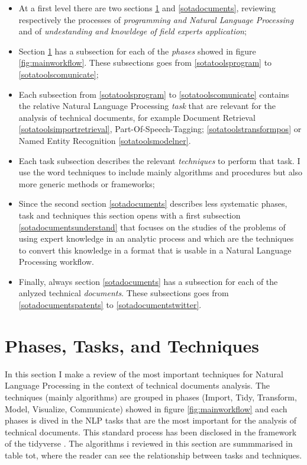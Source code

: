 \documentclass[]{book}
\providecommand{\tightlist}{%
  \setlength{\itemsep}{0pt}\setlength{\parskip}{0pt}}
\begin{document}
\begin{itemize}
\tightlist
\item
  At a first level there are two sections \ref{sotatools} and
  \ref{sotadocuments}, reviewing respectively the processes of
  \emph{programming and Natural Language Processing} and of
  \emph{undestanding and knowldege of field experts application};
\item
  Section \ref{sotatools} has a subsection for each of the \emph{phases}
  showed in figure \ref{fig:mainworkflow}. These subsections goes from
  \ref{sotatoolsprogram} to \ref{sotatoolscomunicate};
\item
  Each subsection from \ref{sotatoolsprogram} to
  \ref{sotatoolscomunicate} contains the relative Natural Language
  Processing \emph{task} that are relevant for the analysis of technical
  documents, for example Document Retrieval
  \ref{sotatoolsimportretrieval}, Part-Of-Speech-Tagging;
  \ref{sotatoolstransformpos} or Named Entity Recognition
  \ref{sotatoolsmodelner}.
\item
  Each task subsection describes the relevant \emph{techniques} to
  perform that task. I use the word techniques to include mainly
  algorithms and procedures but also more generic methods or frameworks;
\item
  Since the second section \ref{sotadocuments} describes less systematic
  phases, task and techniques this section opens with a first subsection
  \ref{sotadocumentsunderstand} that focuses on the studies of the
  problems of using expert knowledge in an analytic process and which
  are the techniques to convert this knowledge in a format that is
  usable in a Natural Language Processing workflow.
\item
  Finally, always section \ref{sotadocuments} has a subsection for each
  of the anlyzed technical \emph{documents}. These subsections goes from
  \ref{sotadocumentspatents} to \ref{sotadocumentstwitter}.
\end{itemize}

\chapter{Phases, Tasks, and Techniques}\label{sotatools}

In this section I make a review of the most important techniques for
Natural Language Processing in the context of technical documents
analysis. The techniques (mainly algorithms) are grouped in phases
(Import, Tidy, Transform, Model, Visualize, Communicate) showed in
figure \ref{fig:mainworkflow} and each phases is dived in the NLP tasks
that are the most important for the analysis of technical documents.
This standard process has been disclosed in the framework of the
tidyverse \citep{wickham2016r}. The algorithms i reviewed in this
section are summmarised in table tot, where the reader can see the
relationship between tasks and techniques.
\end{document}
